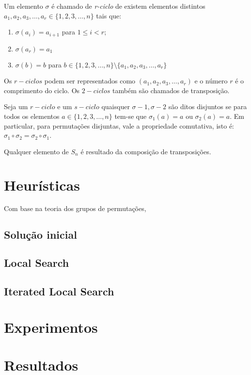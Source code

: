 \documentclass[a4paper,10pt,onecolumn]{article}
\begin{document}
Um elemento $\sigma$ é chamado de \emph{r-ciclo} de existem elementos
distintos $a_1,a_2,a_3,\dots,a_r \in \{1,2,3,\dots, n\}$ tais que:
\begin{enumerate}
\item{$\sigma(a_i) = a_{i+1}$ para $1 \leq i < r$;}
\item{$\sigma(a_r) = a_1$}
\item{$\sigma(b)=b$ para $b \in \{1,2,3,\dots, n\} \setminus
\{a_1,a_2,a_3,\dots,a_r\} $}
\end{enumerate}

Os $r-ciclos$ podem ser representados como $(a_1,a_2,a_3,\dots,a_r)$ e o
número $r$ é o comprimento do ciclo.  Os $2-ciclos$ também são chamados de
transposição.

Seja um $r-ciclo$ e um $s-ciclo$ quaisquer $\sigma-1,\sigma-2$ são ditos
disjuntos se para todos os elementos $a \in \{1,2,3,\dots, n\}$ tem-se que
$\sigma_1(a)=a $ ou $\sigma_2(a)=a$.  Em particular, para permutações
disjuntas, vale a propriedade comutativa, isto é: $\sigma_1 \circ \sigma_2 =
\sigma_2 \circ \sigma_1$.

Qualquer elemento de $S_n$ é resultado da composição de transposições.

\section{Heurísticas}

Com base na teoria dos grupos de permutações, 

\subsection{Solução inicial}

\subsection{Local Search}

\subsection{Iterated Local Search}

\section{Experimentos}

\section{Resultados}
\end{document}
